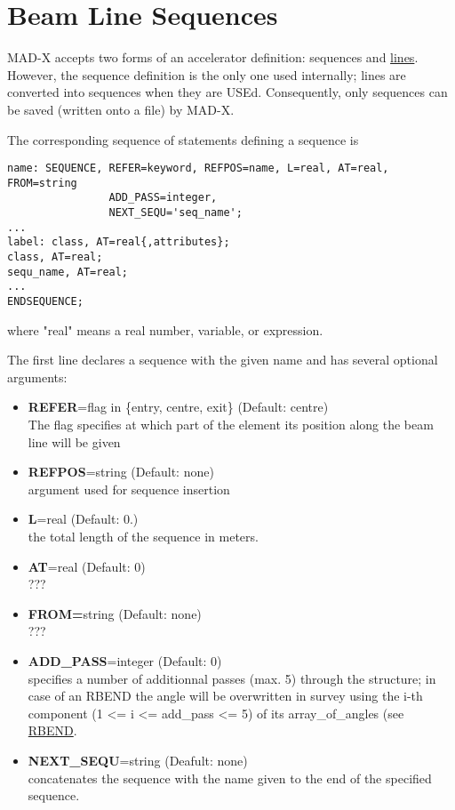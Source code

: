 
\chapter{Beam Line Sequences}
\label{chap:sequence}
 
MAD-X accepts two forms of an accelerator definition: sequences and
\href{line.html}{lines}. However, the sequence definition is the only
one used internally; lines are converted into sequences when they are
USEd. Consequently, only sequences can be saved (written onto a file)
by MAD-X.  

The corresponding sequence of statements defining a sequence is 
\begin{verbatim}
name: SEQUENCE, REFER=keyword, REFPOS=name, L=real, AT=real, FROM=string
                ADD_PASS=integer,
                NEXT_SEQU='seq_name';
...
label: class, AT=real{,attributes}; 
class, AT=real;
sequ_name, AT=real;
...
ENDSEQUENCE;
\end{verbatim} 
where "real" means a real number, variable, or expression. 

The first line declares a sequence with the given name and has several
optional arguments:
\begin{itemize}
   \item {\bf REFER}=flag in \{entry, centre, exit\} (Default: centre) \\
     The flag specifies at which part of the element its position along
     the beam line will be given
   \item {\bf REFPOS}=string (Default: none)\\
     argument used for sequence insertion
   \item {\bf L}=real (Default: 0.)\\
     the total length of the sequence in meters. 
   \item {\bf AT}=real (Default: 0)\\
     ???
   \item {\bf FROM=}string (Default: none)\\
     ???
   \item {\bf ADD\_PASS}=integer (Default: 0)\\ 
     specifies a number of additionnal passes (max. 5) through the
     structure; in case of an RBEND the angle will be overwritten in  survey
     using the i-th component (1 \textless = i \textless = add\_pass
     \textless= 5) of its array\_of\_angles (see \href{bend.html}{RBEND}.
   \item {\bf NEXT\_SEQU}=string (Deafult: none)\\
     concatenates the sequence with the name given to the end of the
     specified sequence. 
\end{itemize}
 
